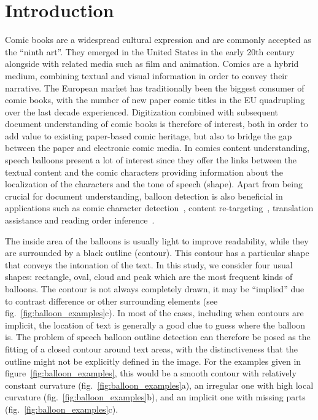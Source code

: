 \documentclass[conference]{IEEEtran}
\begin{document}
\section{Introduction}
Comic books are a widespread cultural expression and are commonly accepted as the ``ninth art''. They emerged in the United States in the early 20th century alongside with related media such as film and animation. Comics are a hybrid medium, combining textual and visual information in order to convey their narrative. The European market has traditionally been the biggest consumer of comic books, with the number of new paper comic titles in the EU quadrupling over the last decade experienced. Digitization combined with subsequent document understanding of comic books is therefore of interest, both in order to add value to existing paper-based comic heritage, but also to bridge the gap between the paper and electronic comic media.
In comics content understanding, speech balloons present a lot of interest since they offer the links between the textual content and the comic characters providing information about the localization of the characters and the tone of speech (shape). Apart from being crucial for document understanding, balloon detection is also beneficial in applications such as comic character detection~\cite{Sun2011}, content re-targeting~\cite{Matsui2011}, translation assistance and reading order inference~\cite{Guerin2012}.

The inside area of the balloons is usually light to improve readability, while they are surrounded by a black outline (contour). This contour has a particular shape that conveys the intonation of the text. In this study, we consider four usual shapes: rectangle, oval, cloud and peak which are the most frequent kinds of balloons. The contour is not always completely drawn, it may be ``implied'' due to contrast difference or other surrounding elements (see fig.~\ref{fig:balloon_examples}c).
In most of the cases, including when contours are implicit, the location of text is generally a good clue to guess where the balloon is. The problem of speech balloon outline detection can therefore be posed as the fitting of a closed contour around text areas, with the distinctiveness that the outline might not be explicitly defined in the image. For the examples given in figure~\ref{fig:balloon_examples}, this would be a smooth contour with relatively constant curvature (fig.~\ref{fig:balloon_examples}a), an irregular one with high local curvature (fig.~\ref{fig:balloon_examples}b), and an implicit one with missing parts (fig.~\ref{fig:balloon_examples}c).
\end{document}
